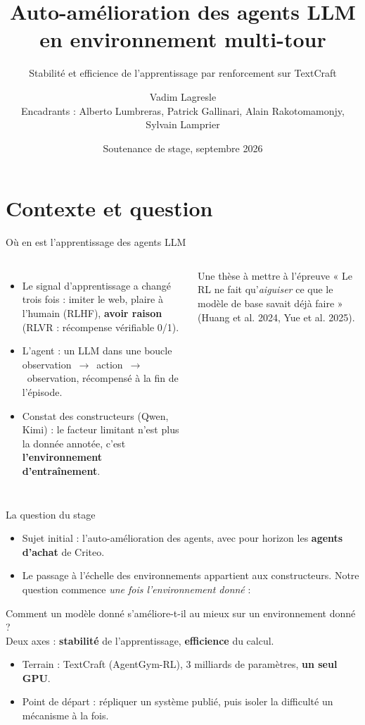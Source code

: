 \documentclass[aspectratio=169,11pt]{beamer}
\title{Auto-amélioration des agents LLM en environnement multi-tour}
\subtitle{Stabilité et efficience de l'apprentissage par renforcement sur TextCraft}
\author{Vadim Lagresle \\ \small Encadrants : Alberto Lumbreras, Patrick Gallinari, Alain Rakotomamonjy, Sylvain Lamprier}
\institute{Criteo AI Lab}
\date{Soutenance de stage, septembre 2026}
\begin{document}
\begin{frame}[plain]
\titlepage
\end{frame}

\section{Contexte et question}

\begin{frame}{Où en est l'apprentissage des agents LLM}
\begin{columns}[T]
\begin{itemize}
    \item Le signal d'apprentissage a changé trois fois : imiter le web, plaire à l'humain (RLHF), \textbf{avoir raison} (RLVR : récompense vérifiable 0/1).
    \item L'agent : un LLM dans une boucle observation~$\to$~action~$\to$~observation, récompensé à la fin de l'épisode.
    \item Constat des constructeurs (Qwen, Kimi) : le facteur limitant n'est plus la donnée annotée, c'est \textbf{l'environnement d'entraînement}.
\end{itemize}
\begin{block}{Une thèse à mettre à l'épreuve}
« Le RL ne fait qu'\emph{aiguiser} ce que le modèle de base savait déjà faire » (Huang et al. 2024, Yue et al. 2025).
\end{block}
\end{columns}
\end{frame}

\begin{frame}{La question du stage}
\begin{itemize}
    \item Sujet initial : l'auto-amélioration des agents, avec pour horizon les \textbf{agents d'achat} de Criteo.
    \item Le passage à l'échelle des environnements appartient aux constructeurs. Notre question commence \emph{une fois l'environnement donné} :
\end{itemize}
\begin{center}
\Large Comment un modèle donné s'améliore-t-il au mieux sur un environnement donné ?\\[4pt]
\normalsize Deux axes : \textbf{stabilité} de l'apprentissage, \textbf{efficience} du calcul.
\end{center}
\begin{itemize}
    \item Terrain : TextCraft (AgentGym-RL), 3 milliards de paramètres, \textbf{un seul GPU}.
    \item Point de départ : répliquer un système publié, puis isoler la difficulté un mécanisme à la fois.
\end{itemize}
\end{frame}
\end{document}
